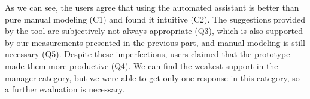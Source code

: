 As we can see, the users agree that using the automated assistant is better than pure manual modeling (C1) and found it intuitive (C2).
The suggestions provided by the tool are subjectively not always appropriate (Q3), which is also supported by our measurements presented in the previous part, and manual modeling is still necessary (Q5).
Despite these imperfections, users claimed that the prototype made them more productive (Q4).
We can find the weakest support in the manager category, but we were able to get only one response in this category, so a further evaluation is necessary.